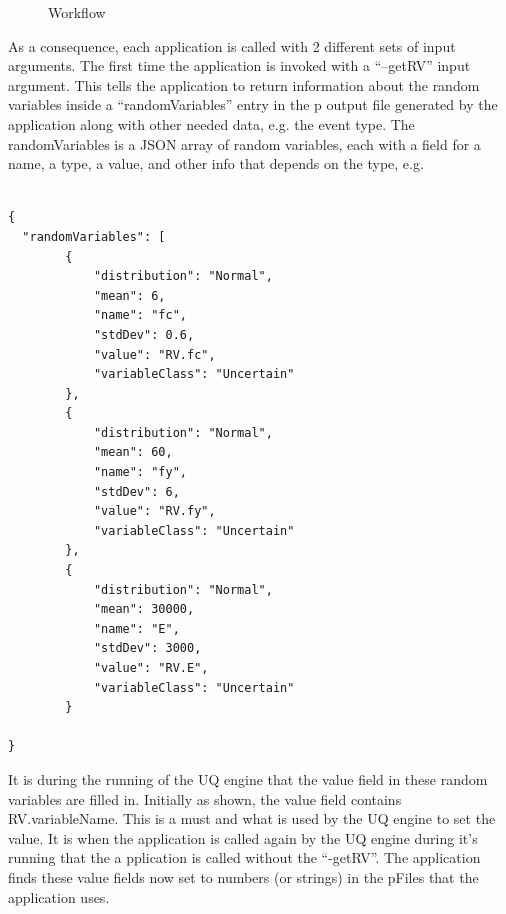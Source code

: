 \begin{figure}[!htbp]
  \caption{Workflow}
  \label{fig:figure18}
\end{figure}

As a consequence, each application is called with 2 different sets of input arguments. The first time the application is invoked with a “–getRV” 
input argument. This tells the application to return information about the random variables inside a “randomVariables” entry in the p output file 
generated by the application along with other needed data, e.g. the event type. The randomVariables is a JSON array of random variables, each with a field for a name, a type, a value, and other info that depends on the type, e.g. \\ \\


\begin{lstlisting}
{
  "randomVariables": [
        {
            "distribution": "Normal",
            "mean": 6,
            "name": "fc",
            "stdDev": 0.6,
            "value": "RV.fc",
            "variableClass": "Uncertain"
        },
        {
            "distribution": "Normal",
            "mean": 60,
            "name": "fy",
            "stdDev": 6,
            "value": "RV.fy",
            "variableClass": "Uncertain"
        },
        {
            "distribution": "Normal",
            "mean": 30000,
            "name": "E",
            "stdDev": 3000,
            "value": "RV.E",
            "variableClass": "Uncertain"
        }

}
\end{lstlisting}


It is during the running of the UQ engine that the value field in these random variables are filled in. Initially as shown, the value field contains RV.variableName. 
This is a must and what is used by the UQ engine to set the value. It is when the application is called again by the UQ engine during it’s running that the a
pplication is called without the “-getRV”. The application finds these value fields now set to numbers (or strings) in the pFiles that the application uses. \\


